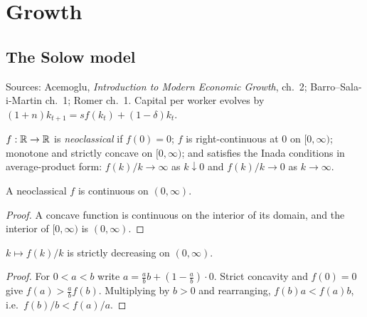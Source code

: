\chapter{Growth}
\label{chap:growth}

\section{The Solow model}
\label{sec:solow}

Sources: Acemoglu, \emph{Introduction to Modern Economic Growth}, ch.~2; Barro--Sala-i-Martin ch.~1;
Romer ch.~1. Capital per worker evolves by $(1 + n) k_{t+1} = s f(k_t) + (1 - \delta) k_t$.

\begin{definition}
\label{def:neoclassical}
\leanok
$f : \mathbb{R} \to \mathbb{R}$ is \emph{neoclassical} if $f(0) = 0$; $f$ is right-continuous at $0$ on $[0, \infty)$;
monotone and strictly concave on $[0, \infty)$; and satisfies the Inada conditions in average-product form:
$f(k)/k \to \infty$ as $k \downarrow 0$ and $f(k)/k \to 0$ as $k \to \infty$.
\end{definition}

\begin{lemma}
\label{lem:neoclassical_continuousOn}
\leanok
{}
A neoclassical $f$ is continuous on $(0, \infty)$.
\end{lemma}
\begin{proof}
\leanok
A concave function is continuous on the interior of its domain, and the interior of $[0, \infty)$ is $(0, \infty)$.
\end{proof}

\begin{lemma}
\label{lem:avg_strictAnti}
\leanok
{}
$k \mapsto f(k)/k$ is strictly decreasing on $(0, \infty)$.
\end{lemma}
\begin{proof}
\leanok
For $0 < a < b$ write $a = \frac{a}{b} b + (1 - \frac{a}{b}) \cdot 0$. Strict concavity and $f(0) = 0$
give $f(a) > \frac{a}{b} f(b)$. Multiplying by $b > 0$ and rearranging, $f(b) a < f(a) b$, i.e.\
$f(b)/b < f(a)/a$.
\end{proof}

